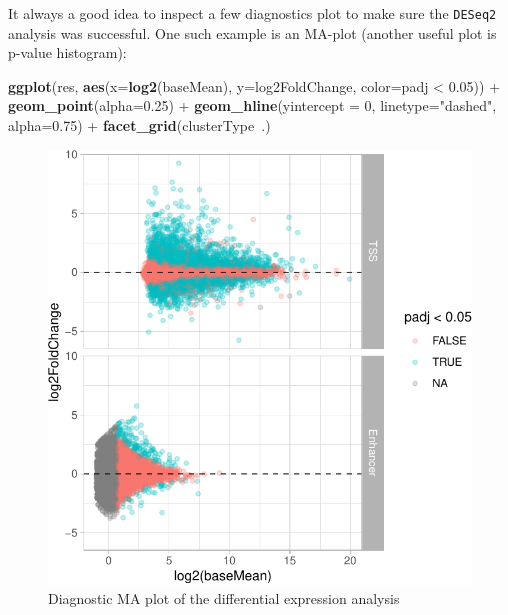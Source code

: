 \documentclass[9pt,a4paper,]{extarticle}
\newenvironment{Shaded}{\begin{snugshade}}{\end{snugshade}}
\newcommand{\KeywordTok}[1]{\textcolor[rgb]{0.13,0.29,0.53}{\textbf{{#1}}}}
\newcommand{\DataTypeTok}[1]{\textcolor[rgb]{0.13,0.29,0.53}{{#1}}}
\newcommand{\DecValTok}[1]{\textcolor[rgb]{0.00,0.00,0.81}{{#1}}}
\newcommand{\FloatTok}[1]{\textcolor[rgb]{0.00,0.00,0.81}{{#1}}}
\newcommand{\StringTok}[1]{\textcolor[rgb]{0.31,0.60,0.02}{{#1}}}
\newcommand{\NormalTok}[1]{{#1}}
\begin{document}
It always a good idea to inspect a few diagnostics plot to make sure the \texttt{DESeq2} analysis was successful. One such example is an MA-plot (another useful plot is p-value histogram):

\begin{Shaded}
\begin{Highlighting}[]
\KeywordTok{ggplot}\NormalTok{(res, }\KeywordTok{aes}\NormalTok{(}\DataTypeTok{x=}\KeywordTok{log2}\NormalTok{(baseMean), }\DataTypeTok{y=}\NormalTok{log2FoldChange, }\DataTypeTok{color=}\NormalTok{padj <}\StringTok{ }\FloatTok{0.05}\NormalTok{)) +}
\StringTok{    }\KeywordTok{geom_point}\NormalTok{(}\DataTypeTok{alpha=}\FloatTok{0.25}\NormalTok{) +}
\StringTok{    }\KeywordTok{geom_hline}\NormalTok{(}\DataTypeTok{yintercept =} \DecValTok{0}\NormalTok{, }\DataTypeTok{linetype=}\StringTok{"dashed"}\NormalTok{, }\DataTypeTok{alpha=}\FloatTok{0.75}\NormalTok{) +}
\StringTok{    }\KeywordTok{facet_grid}\NormalTok{(clusterType~.)}
\end{Highlighting}
\end{Shaded}

\begin{figure}

{\centering \includegraphics{CAGEWorkflow_files/figure-latex/diagnosticPlot-1} 

}

\caption{Diagnostic MA plot of the differential expression analysis}\label{fig:diagnosticPlot}
\end{figure}
\end{document}
